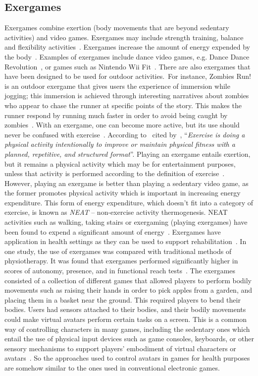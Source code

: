 \subsection{Exergames}
Exergames combine exertion (body movements that are beyond sedentary activities) and video games. Exergames may include strength training, balance and flexibility activities~\citep{oh2010defining}. Exergames increase the amount of energy expended by the body~\citep{graves2010physiological}. Examples of exergames include  dance video games, e.g. Dance Dance Revolution~\citep{lieberman2006dance}, or games such as Nintendo Wii Fit~\citep{gobel2010serious}. There are also exergames that have been designed to be used for outdoor activities.~For instance, Zombies Run! is an outdoor exergame that gives users the experience of immersion while jogging; this immersion is achieved through interesting narratives about zombies who appear to chase the runner at specific points of the story. This makes the runner respond by running much faster in order to avoid being caught by zombies~\citep{southerton2013zombies}. With an exergame, one can become more active, but its use should never be confused with exercise~\citep{oh2010defining}. According to~\cite{caspersen1985physical} cited by~\cite{oh2010defining}, ``\emph{Exercise is doing a physical activity intentionally to improve or maintain physical fitness with a planned, repetitive, and structured format}''. Playing an exergame entails exertion, but it remains a physical activity which may be for entertainment purposes, unless that activity is performed according to the definition of exercise~\citep{oh2010defining}. However, playing an exergame is better than playing a sedentary video game, as the former promotes physical activity which is important in increasing energy expenditure. This form of energy expenditure, which doesn't fit into a category of exercise, is known as \emph{NEAT} -- non-exercise activity thermogenesis. NEAT activities such as walking, taking stairs or exergaming (playing exergames) have been found to expend a significant amount of energy~\citep{fujiki2008neat}. Exergames have application in health settings as they can be used to support rehabilitation~\citep{mccallum2012gamification}. In one study, the use of exergames was compared with traditional methods of physiotherapy. It was found that exergames performed significantly higher in scores of autonomy, presence, and in functional reach tests~\citep{smeddinck2015exergames}. The exergames consisted of a collection of different games that allowed players to perform bodily movements such as raising their hands in order to pick apples from a garden, and placing them in a basket near the ground. This required players to bend their bodies. Users had sensors attached to their bodies, and their bodily movements could make virtual avatars perform certain tasks on a screen. This is a common way of controlling characters in many games, including the sedentary ones which entail the use of physical input devices such as game consoles, keyboards, or other sensory mechanisms to support players' embodiment of virtual characters or avatars~\citep{berkovsky2012physical}. So the approaches used to control avatars in games for health purposes are somehow similar to the ones used in conventional electronic games. 

